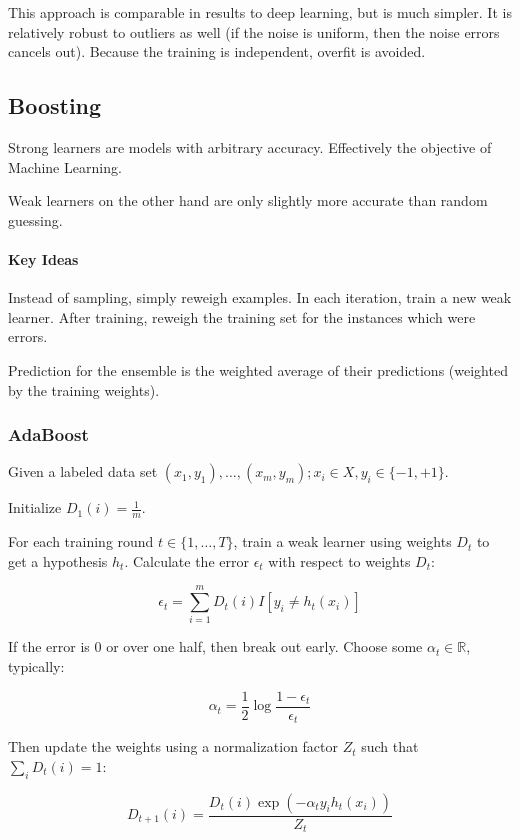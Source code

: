 \documentclass{idc_msc}
\begin{document}
This approach is comparable in results to deep learning, but is much simpler.
It is relatively robust to outliers as well (if the noise is uniform, then the noise errors cancels out).
Because the training is independent, overfit is avoided.

\subsection{Boosting}

Strong learners are models with arbitrary accuracy.
Effectively the objective of Machine Learning.

Weak learners on the other hand are only slightly more accurate than random guessing.

\paragraph{Key Ideas}

Instead of sampling, simply reweigh examples.
In each iteration, train a new weak learner.
After training, reweigh the training set for the instances which were errors.

Prediction for the ensemble is the weighted average of their predictions (weighted by the training weights).

\subsubsection{AdaBoost}

Given a labeled data set \((x_1, y_1),\ldots,(x_m,y_m); x_i \in X, y_i \in \{-1, +1\}\).

Initialize \(D_1(i) = \frac{1}{m}\).

For each training round \(t \in \{1,\ldots,T\}\), train a weak learner using weights \(D_t\) to get a hypothesis \(h_t\).
Calculate the error \(\epsilon_t\) with respect to weights \(D_t\):

\[\epsilon_t = \sum_{i=1}^m D_t(i) I[y_i \ne h_t(x_i)]\]

If the error is \(0\) or over one half, then break out early.
Choose some \(\alpha_t \in \mathbb{R}\), typically:

\[\alpha_t = \frac{1}{2}\log \frac{1-\epsilon_t}{\epsilon_t}\]

Then update the weights using a normalization factor \(Z_t\) such that \(\sum_i D_t(i) = 1\):

\[D_{t+1}(i) = \frac{D_t(i) \exp(-\alpha_t y_i h_t(x_i))}{Z_t}\]
\end{document}
